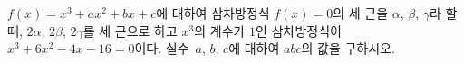 $f(x)=x^3+ax^2+bx+c$에 대하여 삼차방정식 $f(x)=0$의 세 근을 $\alpha$, $\beta$, $\gamma$라 할 때, $2\alpha$, $2\beta$, $2\gamma$를 세 근으로 하고 $x^3$의 계수가 $1$인 삼차방정식이 $x^3+6x^2-4x-16=0$이다. 실수~$a$, $b$, $c$에 대하여 $abc$의 값을 구하시오.
